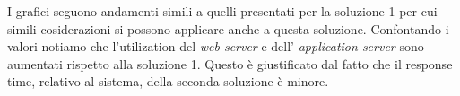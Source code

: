 \documentclass[../main.tex]{subfiles}
\begin{document}
    I grafici seguono andamenti simili a quelli presentati per la soluzione 1 per cui simili cosiderazioni si possono
    applicare anche a questa soluzione.
    Confontando i valori notiamo che l'utilization del \textit{web server} e dell' \textit{application server} sono
    aumentati rispetto alla soluzione 1.
    Questo è giustificato dal fatto che il response time, relativo al sistema, della seconda soluzione è minore.
\end{document}
